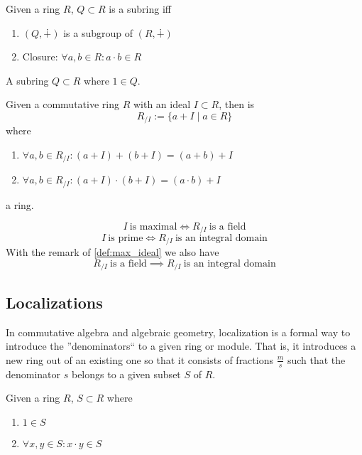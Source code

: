 \begin{definition}[Subring]
   Given a ring \(R\), \(Q \subset R\) is a subring iff
   \begin{enumerate}[label=\roman*, align=Center]
      \item \((Q, \dotplus)\) is a subgroup of \((R, \dotplus)\)
      \item Closure: \(\forall a, b \in R: a \cdot b \in R\)
   \end{enumerate}
\end{definition}

\begin{definition}
   A subring \(Q \subset R\) where \(1 \in Q\).
\end{definition}

\begin{definition}
   Given a commutative ring \(R\) with an ideal \(I \subset R\), then is
   \[R_{/I} := \{a + I \mid a \in R\}\]
   where
   \begin{enumerate}[label=\roman*, align=Center]
      \item \(\forall a, b \in R_{/I}: (a + I) + (b + I) = (a + b) + I\)
      \item \(\forall a, b \in R_{/I}: (a + I) \cdot (b + I) = (a \cdot b) + I\)
   \end{enumerate}
   a ring.
\end{definition}
\begin{remark}
   \[I~\text{is maximal} \iff R_{/I}~\text{is a field}\] %
   \[I~\text{is prime} \iff R_{/I}~\text{is an integral domain}\]
   With the remark of \cref{def:max_ideal} we also have
   \[R_{/I}~\text{is a field} \implies R_{/I}~\text{is an integral domain}\]
\end{remark}

\subsection{Localizations}
In commutative algebra and algebraic geometry, localization is a formal way to introduce the ''denominators`` to a given ring or module.
That is, it introduces a new ring out of an existing one so that it consists of fractions \(\frac{m}{s}\) such that the denominator \(s\) belongs to a given subset \(S\) of \(R\).
\begin{definition}
   Given a ring \(R\), \(S \subset R\) where
   \begin{enumerate}[label=\roman*, align=Center]
      \item \(1 \in S\)
      \item \(\forall x, y \in S: x \cdot y \in S\)
   \end{enumerate}
\end{definition}

